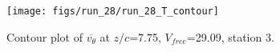 \begin{figure}[H]
\centering
\texttt{[image: figs/run\_28/run\_28\_T\_contour]}
\caption{Contour plot of $\overline{v_{\theta}}$ at $z/c$=7.75, $V_{free}$=29.09, station 3.}
\label{fig:run_28_T_contour}
\end{figure}


